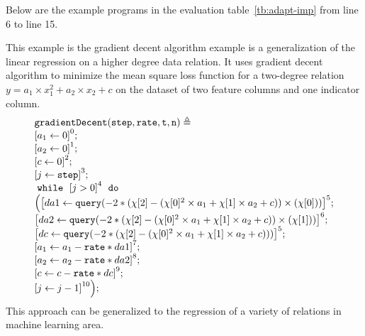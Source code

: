 Below are the example programs in the evaluation table~\ref{tb:adapt-imp}
from  line 6 to line 15.
%
    \begin{example}
        This example is the gradient decent algorithm example is a generalization of the linear regression on a higher degree data relation.
        It uses gradient decent algorithm to minimize 
        the mean square loss function
        for a two-degree relation
         $y = a_1 \times x_1^2 + a_2 \times x_2 + c$
        on the dataset of two feature columns and one indicator column.
     \[
     \begin{array}{l}
     \kw{gradientDecent(step, rate, t, n)} \triangleq \\
        \clabel{ a_1 \leftarrow 0}^{0} ; \\
        \clabel{ a_2 \leftarrow 0}^{1} ; \\
        \clabel{ c \leftarrow 0}^{2} ; \\
        \clabel{\assign{j}{\kw{step}} }^{3} ; \\
        \ewhile ~ \clabel{j > 0}^{4} ~ \edo ~ \\
      \Big(
          \clabel{\assign{da1}{\query(-2 * (\chi[2] - (\chi[0]^2 \times a_1 + \chi[1] \times a_2 + c)) \times (\chi[0]))} }^{5}  ; \\
          \clabel{\assign{da2}{\query(-2 * (\chi[2] - (\chi[0]^2 \times a_1 + \chi[1] \times a_2 + c)) \times (\chi[1]))} }^{6}  ; \\  \clabel{\assign{dc}{\query(-2 * (\chi[2] - (\chi[0]^2 \times a_1 + \chi[1] \times a_2 + c)))} }^{5}  ; \\
          \clabel{\assign{a_1}{a_1 - \kw{rate} * da1} }^{7}  ; \\
          \clabel{\assign{a_2}{a_2 - \kw{rate} * da2} }^{8}  ; \\
          \clabel{\assign{c}{c - \kw{rate} * dc} }^{9}  ; \\
       \clabel{\assign{j}{j-1}}^{10} 
      \Big);
  \end{array}
     \]
        This approach can be generalized to the regression of a variety of 
        relations in machine learning area.
     \end{example}
%

